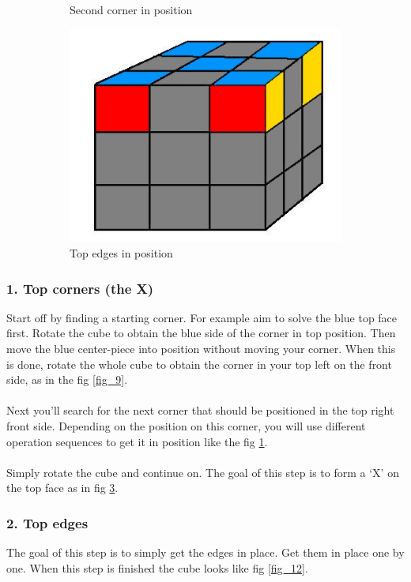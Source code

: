 \documentclass[a4paper,11pt]{kth-mag}
\begin{document}
\begin{figure}[b]
\begin{subfigure}[!b]{0.3\textwidth}
		\caption{Second corner in position}
		\label{fig_10}
	\end{subfigure}
	\begin{subfigure}[!b]{0.3\textwidth}
		\includegraphics[width=\textwidth]{figs/rubiks-4-corners.jpg}
		\caption{Top edges in position}
		\label{fig_11}
	\end{subfigure}
	\caption{}
\end{figure}

\subsubsection{1. Top corners (the X)}
Start off by finding a starting corner. For example aim to solve the blue top face first. Rotate the cube to obtain the blue side of the corner in top position. Then move the blue center-piece into position without moving your corner. When this is done, rotate the whole cube to obtain the corner in your top left on the front side, as in the fig \ref{fig_9}.\\\\
Next you’ll search for the next corner that should be positioned in the top right front side. Depending on the position on this corner, you will use different operation sequences to get it in position like the fig \ref{fig_10}.\\\\
Simply rotate the cube and continue on. The goal of this step is to form a ‘X’ on the top face as in fig \ref{fig_11}.
\subsubsection{2. Top edges}
The goal of this step is to simply get the edges in place. Get them in place one by one. When this step is finished the cube looks like fig \ref{fig_12}.
\end{document}
